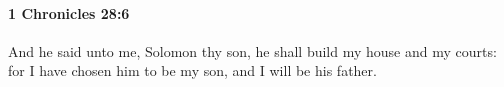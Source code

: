 
		\paragraph{1 Chronicles 28:6} %
			\label{1CHRONICLES-28-6}

			And he said unto me, Solomon thy son, he shall build my house and my courts: for I have chosen him to be my son, and I will be his father.


